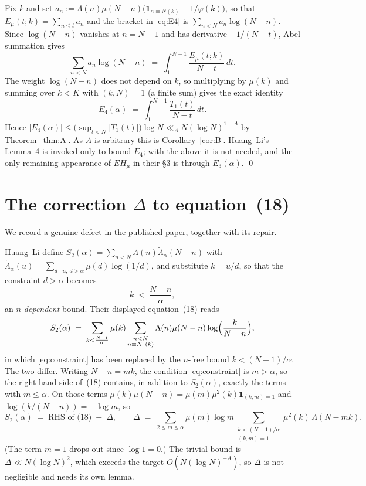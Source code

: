 \documentclass[11pt,a4paper]{article}
\theoremstyle{plain}
\theoremstyle{definition}
\newcommand{\Emu}{E_\mu}
\begin{document}
Fix $k$ and set
$a_n:=\Lambda(n)\mu(N-n)\bigl(\mathbf 1_{n\equiv N (k)}-1/\varphi(k)\bigr)$,
so that $\Emu(t;k)=\sum_{n\le t}a_n$ and the bracket in \eqref{eq:E4} is
$\sum_{n<N}a_n\log(N-n)$. Since $\log(N-n)$ vanishes at $n=N-1$ and has
derivative $-1/(N-t)$, Abel summation gives
\[
  \sum_{n<N}a_n\log(N-n) \;=\; \int_{1}^{N-1}\frac{\Emu(t;k)}{N-t}\,dt .
\]
The weight $\log(N-n)$ does not depend on $k$, so multiplying by
$\mu(k)$ and summing over $k<K$ with $(k,N)=1$ (a finite sum) gives the
exact identity
\[
  E_4(\alpha) \;=\; \int_{1}^{N-1}\frac{T_1(t)}{N-t}\,dt .
\]
Hence $|E_4(\alpha)|\le\bigl(\sup_{t<N}|T_1(t)|\bigr)\log N
\ll_A N(\log N)^{1-A}$ by Theorem~\ref{thm:A}. As $A$ is arbitrary this
is Corollary~\ref{cor:B}. Huang--Li's Lemma~4 is invoked only to bound
$E_4$; with the above it is not needed, and the only remaining
appearance of $EH_\mu$ in their §3 is through $E_3(\alpha)$. \qed

\section{The correction $\Delta$ to equation~(18)}\label{sec:delta}

We record a genuine defect in the published paper, together with its
repair.

Huang--Li define
$S_2(\alpha)=\sum_{n<N}\Lambda(n)\tilde\Lambda_\alpha(N-n)$ with
$\tilde\Lambda_\alpha(u)=\sum_{d\mid u,\ d>\alpha}\mu(d)\log(1/d)$, and
substitute $k=u/d$, so that the constraint $d>\alpha$ becomes
\begin{equation}\label{eq:constraint}
  k \;<\; \frac{N-n}{\alpha},
\end{equation}
an \emph{$n$-dependent} bound. Their displayed equation~(18) reads
\[
  S_2(\alpha) \;=\; \sum_{k<\frac{N-1}{\alpha}}\mu(k)
    \sum_{\substack{n<N\\ n\equiv N\ (k)}}
    \Lambda(n)\mu(N-n)\log\Bigl(\frac{k}{N-n}\Bigr),
\]
in which \eqref{eq:constraint} has been replaced by the $n$-free bound
$k<(N-1)/\alpha$. The two differ. Writing $N-n=mk$, the condition
\eqref{eq:constraint} is $m>\alpha$, so the right-hand side of~(18)
contains, in addition to $S_2(\alpha)$, exactly the terms with
$m\le\alpha$. On those terms
$\mu(k)\mu(N-n)=\mu(m)\mu^2(k)\mathbf 1_{(k,m)=1}$ and
$\log(k/(N-n))=-\log m$, so
\begin{equation}\label{eq:Delta}
  S_2(\alpha) \;=\; \text{RHS of (18)} \;+\; \Delta,
  \qquad
  \Delta \;=\; \sum_{2\le m\le\alpha}\mu(m)\log m
    \sum_{\substack{k<(N-1)/\alpha\\ (k,m)=1}}\mu^2(k)\,\Lambda(N-mk).
\end{equation}
(The term $m=1$ drops out since $\log1=0$.) The trivial bound is
$\Delta\ll N(\log N)^2$, which exceeds the target
$O(N(\log N)^{-A})$, so $\Delta$ is not negligible and needs its own
lemma.
\end{document}
